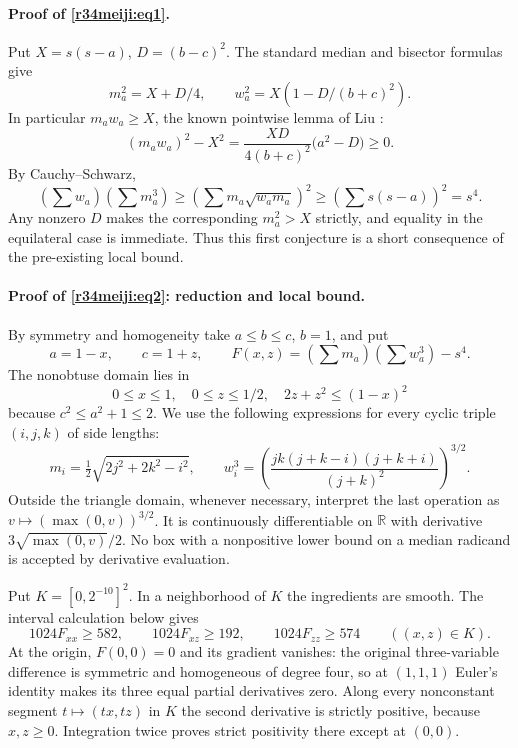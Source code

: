 \documentclass[11pt,a4paper]{article}
\numberwithin{equation}{section}
\theoremstyle{definition}
\theoremstyle{remark}
\begin{document}
\paragraph{Proof of \eqref{r34meiji:eq1}.}
Put $X=s(s-a)$, $D=(b-c)^2$. The standard median and bisector formulas give
\[
 m_a^2=X+D/4,\qquad w_a^2=X(1-D/(b+c)^2).
\]
In particular $m_aw_a\ge X$, the known pointwise lemma of Liu \cite[Lemma 6, Eq.~(27)]{r34meiji:gaz}:
\[
 (m_aw_a)^2-X^2
   =\frac{XD}{4(b+c)^2}\bigl(a^2-D\bigr)\ge0 .
\]
By Cauchy--Schwarz,
\[
 \left(\sum w_a\right)\left(\sum m_a^3\right)
 \ge\left(\sum m_a\sqrt{w_am_a}\right)^2
 \ge\left(\sum s(s-a)\right)^2=s^4 .
\]
Any nonzero $D$ makes the corresponding $m_a^2>X$ strictly, and equality in the equilateral case is immediate. Thus this first conjecture is a short consequence of the pre-existing local bound.

\paragraph{Proof of \eqref{r34meiji:eq2}: reduction and local bound.}
By symmetry and homogeneity take $a\le b\le c$, $b=1$, and put
\[
 a=1-x,\qquad c=1+z,\qquad
 F(x,z)=\left(\sum m_a\right)\left(\sum w_a^3\right)-s^4 .
\]
The nonobtuse domain lies in
\[
 0\le x\le1,\quad 0\le z\le1/2,\quad 2z+z^2\le(1-x)^2
\]
because $c^2\le a^2+1\le 2$. We use the following expressions for every cyclic triple $(i,j,k)$ of side lengths:
\[
 m_i=\tfrac12\sqrt{2j^2+2k^2-i^2},\qquad
 w_i^3=\left(\frac{jk(j+k-i)(j+k+i)}{(j+k)^2}\right)^{3/2}.
\]
Outside the triangle domain, whenever necessary, interpret the last operation as $v\mapsto(\max(0,v))^{3/2}$. It is continuously differentiable on $\mathbb R$ with derivative $3\sqrt{\max(0,v)}/2$. No box with a nonpositive lower bound on a median radicand is accepted by derivative evaluation.

Put $K=[0,2^{-10}]^2$. In a neighborhood of $K$ the ingredients are smooth. The interval calculation below gives
\[
 1024F_{xx}\ge582,\qquad 1024F_{xz}\ge192,\qquad
 1024F_{zz}\ge574\qquad ((x,z)\in K).
\]
At the origin, $F(0,0)=0$ and its gradient vanishes: the original three-variable difference is symmetric and homogeneous of degree four, so at $(1,1,1)$ Euler's identity makes its three equal partial derivatives zero. Along every nonconstant segment $t\mapsto (tx,tz)$ in $K$ the second derivative is strictly positive, because $x,z\ge0$. Integration twice proves strict positivity there except at $(0,0)$.
\end{document}

